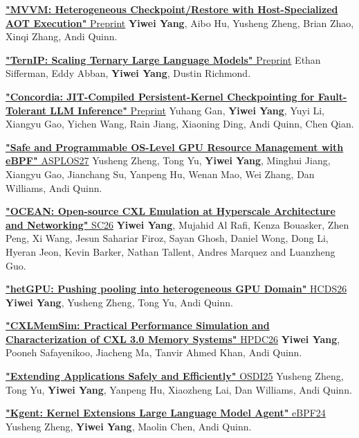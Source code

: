 \documentclass{resume}
\begin{document}
\href{https://arxiv.org/pdf/2410.15894}{\textbf{"MVVM: Heterogeneous Checkpoint/Restore with Host-Specialized AOT Execution"} Preprint} \textbf{Yiwei Yang}, Aibo Hu, Yusheng Zheng, Brian Zhao, Xinqi Zhang, Andi Quinn.

\href{https://asplos.dev/pdf/TernIP.pdf}{\textbf{"TernIP: Scaling Ternary Large Language Models"} Preprint} Ethan Sifferman, Eddy Abban, \textbf{Yiwei Yang}, Dustin Richmond.

\href{https://arxiv.org/pdf/2606.23521}{\textbf{"Concordia: JIT-Compiled Persistent-Kernel Checkpointing for Fault-Tolerant LLM Inference"} Preprint} Yuhang Gan, \textbf{Yiwei Yang}, Yuyi Li, Xiangyu Gao, Yichen Wang, Rain Jiang, Xiaoning Ding, Andi Quinn, Chen Qian.

\href{https://arxiv.org/pdf/2512.12615}{\textbf{"Safe and Programmable OS-Level GPU Resource Management with eBPF"} ASPLOS27} Yusheng Zheng, Tong Yu, \textbf{Yiwei Yang}, Minghui Jiang, Xiangyu Gao, Jianchang Su, Yanpeng Hu, Wenan Mao, Wei Zhang, Dan Williams, Andi Quinn.

\href{https://asplos.dev/pdf/OCEAN.pdf}{\textbf{"OCEAN: Open-source CXL Emulation at Hyperscale Architecture and Networking"} SC26} \textbf{Yiwei Yang}, Mujahid Al Rafi, Kenza Bouasker, Zhen Peng, Xi Wang, Jesun Sahariar Firoz, Sayan Ghosh, Daniel Wong, Dong Li, Hyeran Jeon, Kevin Barker, Nathan Tallent, Andres Marquez and Luanzheng Guo.

\href{https://arxiv.org/pdf/2506.15993}{\textbf{"hetGPU: Pushing pooling into heterogeneous GPU Domain"} HCDS26} \textbf{Yiwei Yang}, Yusheng Zheng, Tong Yu, Andi Quinn.

\href{https://arxiv.org/pdf/2303.06153}{\textbf{"CXLMemSim: Practical Performance Simulation and Characterization of CXL 3.0 Memory Systems"} HPDC26} \textbf{Yiwei Yang}, Pooneh Safayenikoo, Jiacheng Ma, Tanvir Ahmed Khan, Andi Quinn.

\href{https://www.usenix.org/system/files/osdi25-zheng-yusheng.pdf}{\textbf{"Extending Applications Safely and Efficiently"} OSDI25} Yusheng Zheng, Tong Yu, \textbf{Yiwei Yang}, Yanpeng Hu, Xiaozheng Lai, Dan Williams, Andi Quinn.

\href{https://arxiv.org/pdf/2312.05531}{\textbf{"Kgent: Kernel Extensions Large Language Model Agent"} eBPF24} Yusheng Zheng, \textbf{Yiwei Yang}, Maolin Chen, Andi Quinn.
\endgroup
\end{document}
